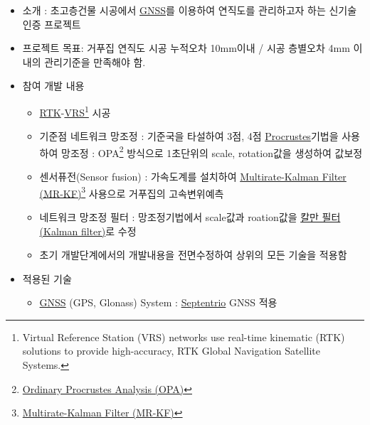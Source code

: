 \documentclass[10pt,a4paper,ragged2e]{altacv}
\begin{document}
\clearpage
\begin{fullwidth}


\begin{itemize}
\item 소개 : 초고층건물 시공에서 \href{http://gnss.ngii.go.kr/info/summary}{GNSS}를 이용하여 연직도를 관리하고자 하는 신기술 인증 프로젝트
\item 프로젝트 목표: 거푸집 연직도 시공 누적오차 10mm이내 / 시공 층별오차 4mm 이내의 관리기준을 만족해야 함.
\item 참여 개발 내용
\begin{itemize}
  \item \href{https://en.wikipedia.org/wiki/Real_Time_Kinematic}{RTK}-\href{https://en.wikipedia.org/wiki/Virtual_Reference_Station}{VRS}\footnote{Virtual Reference Station (VRS) networks use real-time kinematic (RTK) solutions to provide high-accuracy, RTK Global Navigation Satellite Systems.} 시공
  \item 기준점 네트워크 망조정 : 기준국을 타설하여 3점, 4점 \href{https://en.wikipedia.org/wiki/Procrustes_analysis}{Procrustes}기법을 사용하여 망조정 : OPA\footnote{\href{https://en.wikipedia.org/wiki/Procrustes_analysis}{Ordinary Procrustes Analysis (OPA)}} 방식으로 1초단위의 scale, rotation값을 생성하여 값보정 
  \item 센서퓨전(Sensor fusion) : 가속도계를 설치하여 \href{http://scholar.lib.vt.edu/theses/available/etd-062899-064821/unrestricted/etd.PDF}{Multirate-Kalman Filter (MR-KF)}\footnote{\href{http://scholar.lib.vt.edu/theses/available/etd-062899-064821/unrestricted/etd.PDF}{Multirate-Kalman Filter (MR-KF)}} 사용으로 거푸집의 고속변위예측 
  \item 네트워크 망조정 필터 : 망조정기법에서 scale값과 roation값을 \href{https://ko.wikipedia.org/wiki/\%EC\%B9\%BC\%EB\%A7\%8C_\%ED\%95\%84\%ED\%84\%B0}{칼만 필터(Kalman filter)}로 수정
  \item 초기 개발단계에서의 개발내용을 전면수정하여 상위의 모든 기술을 적용함
\end{itemize}
\item 적용된 기술
  \begin{itemize}
    \item \href{http://gnss.ngii.go.kr/info/summary}{GNSS} (GPS, Glonass) System : \href{http://www.septentrio.com/}{Septentrio} GNSS 적용 

\end{itemize}
\end{itemize}
\end{fullwidth}
\end{document}
